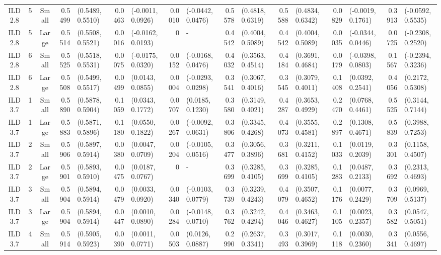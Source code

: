 \begin{landscape}
\begin{table}
\begin{tabular}{cccrlrlrlrlrlrlrl}
ILD2.8	&	5	&	Small	&	0.5499	&	(0.5489, 0.5510)	&	0.0463	&	(-0.0011, 0.0926)	&	0.0010	&	(-0.0442, 0.0476)	&	0.5578	&	(0.4818, 0.6319)	&	0.5588	&	(0.4834, 0.6342)	&	0.0829	&	(-0.0019, 0.1761)	&	0.3913	&	(-0.0592, 0.5535)	\\
ILD2.8	&	5	&	Large	&	0.5514	&	(0.5508, 0.5521)	&	0.0016	&	(-0.0162, 0.0193)	&	0	&	-	&	0.4542	&	(0.4004, 0.5089)	&	0.4542	&	(0.4004, 0.5089)	&	0.0035	&	(-0.0344, 0.0446)	&	0.0725	&	(-0.2308, 0.2520)	\\
ILD2.8	&	6	&	Small	&	0.5525	&	(0.5518, 0.5531)	&	0.0075	&	(-0.0175, 0.0320)	&	0.0152	&	(-0.0168, 0.0476)	&	0.4032	&	(0.3563, 0.4514)	&	0.4184	&	(0.3691, 0.4684)	&	0.0179	&	(-0.0398, 0.0803)	&	0.1567	&	(-0.2394, 0.3236)	\\
ILD2.8	&	6	&	Large	&	0.5508	&	(0.5499, 0.5517)	&	0.0499	&	(0.0143, 0.0855)	&	0.0004	&	(-0.0293, 0.0298)	&	0.3541	&	(0.3067, 0.4016)	&	0.3545	&	(0.3079, 0.4011)	&	0.1408	&	(0.0392, 0.2541)	&	0.4056	&	(0.2172, 0.5308)	\\
ILD3.7	&	1	&	Small	&	0.5890	&	(0.5878, 0.5904)	&	0.1059	&	(0.0343, 0.1772)	&	0.0707	&	(0.0185, 0.1230)	&	0.3580	&	(0.3149, 0.4021)	&	0.4287	&	(0.3653, 0.4929)	&	0.2470	&	(0.0768, 0.4461)	&	0.5525	&	(0.3144, 0.7144)	\\
ILD3.7	&	1	&	Large	&	0.5883	&	(0.5871, 0.5896)	&	0.1180	&	(0.0550, 0.1822)	&	0.0267	&	(-0.0092, 0.0631)	&	0.3806	&	(0.3345, 0.4268)	&	0.4073	&	(0.3555, 0.4581)	&	0.2897	&	(0.1308, 0.4671)	&	0.5839	&	(0.3988, 0.7253)	\\
ILD3.7	&	2	&	Small	&	0.5906	&	(0.5897, 0.5914)	&	0.0380	&	(0.0047, 0.0709)	&	0.0204	&	(-0.0105, 0.0516)	&	0.3477	&	(0.3056, 0.3896)	&	0.3681	&	(0.3211, 0.4152)	&	0.1033	&	(0.0119, 0.2039)	&	0.3301	&	(0.1158, 0.4507)	\\
ILD3.7	&	2	&	Large	&	0.5901	&	(0.5893, 0.5910)	&	0.0475	&	(0.0187, 0.0767)	&	0	&	-	&	0.3699	&	(0.3285, 0.4105)	&	0.3699	&	(0.3285, 0.4105)	&	0.1283	&	(0.0487, 0.2133)	&	0.3692	&	(0.2313, 0.4693)	\\
ILD3.7	&	3	&	Small	&	0.5904	&	(0.5894, 0.5914)	&	0.0479	&	(0.0033, 0.0920)	&	0.0340	&	(-0.0103, 0.0779)	&	0.3739	&	(0.3239, 0.4243)	&	0.4079	&	(0.3507, 0.4652)	&	0.1176	&	(0.0077, 0.2429)	&	0.3709	&	(0.0969, 0.5137)	\\
ILD3.7	&	3	&	Large	&	0.5904	&	(0.5894, 0.5914)	&	0.0447	&	(0.0010, 0.0890)	&	0.0284	&	(-0.0148, 0.0710)	&	0.3762	&	(0.3242, 0.4294)	&	0.4046	&	(0.3463, 0.4627)	&	0.1105	&	(0.0023, 0.2357)	&	0.3582	&	(0.0547, 0.5051)	\\
ILD3.7	&	4	&	Small	&	0.5914	&	(0.5905, 0.5923)	&	0.0390	&	(0.0011, 0.0771)	&	0.0503	&	(0.0126, 0.0887)	&	0.2990	&	(0.2637, 0.3341)	&	0.3493	&	(0.3017, 0.3969)	&	0.1118	&	(0.0030, 0.2360)	&	0.3341	&	(0.0556, 0.4697)	\\

\end{tabular}
\end{table}
\end{landscape}

